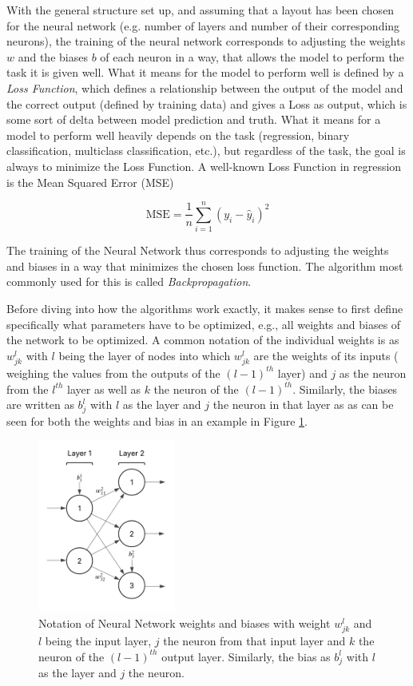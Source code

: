 With the general structure set up, and assuming that a layout has been chosen for the neural network (e.g. number of layers and number of their corresponding neurons), the training of the neural network corresponds to adjusting the weights $w$ and the biases $b$ of each neuron in a way, that allows the model to perform the task it is given well. What it means for the model to perform well is defined by a \textit{Loss Function}, which defines a relationship between the output of the model and the correct output (defined by training data) and gives a Loss as output, which is some sort of delta between model prediction and truth. What it means for a model to perform well heavily depends on the task (regression, binary classification, multiclass classification, etc.), but regardless of the task, the goal is always to minimize the Loss Function. A well-known Loss Function in regression is the Mean Squared Error (MSE)

\[
\text{MSE} = \frac{1}{n} \sum_{i=1}^{n} (y_i - \hat{y}_i)^2
\]

The training of the Neural Network thus corresponds to adjusting the weights and biases in a way that minimizes the chosen loss function. The algorithm most commonly used for this is called \textit{Backpropagation}.
 \cite{nielsen2015neuralChap1}
 
 Before diving into how the algorithms work exactly, it makes sense to first define specifically what parameters have to be optimized, e.g., all weights and biases of the network to be optimized. A common notation of the individual weights is as $w_{jk}^l$ with $l$ being the layer of nodes into which $w_{jk}^l$ are the weights of its inputs ( weighing the values from the outputs of the $(l-1)^{th}$ layer) and $j$ as the neuron from the $l^{th}$ layer as well as $k$ the neuron of the  $(l-1)^{th}$. Similarly, the biases are written as $b_j^l$ with $l$ as the layer and $j$ the neuron in that layer as as can be seen for both the weights and bias in an example in Figure \ref{fig:bias_and_weights_notation}.
 
 
 \begin{figure}[h] 
 	\centering
 	\includegraphics[width=0.4\textwidth]{figures/modelling/bias_and_weights_notation.png} 
 	\caption{Notation of Neural Network weights and biases with weight $w_{jk}^l$ and $l$ being the input layer,  $j$ the neuron from that input layer and $k$ the neuron of the  $(l-1)^{th}$ output layer. Similarly, the bias as $b_j^l$ with $l$ as the layer and $j$ the neuron.}
 	\label{fig:bias_and_weights_notation}
 \end{figure}
 
